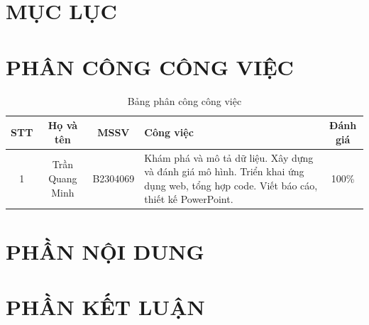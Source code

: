 \documentclass{article} %
\begin{document}
    \pagestyle{empty}
    \renewcommand{\contentsname}{}
    \section*{MỤC LỤC}
    \vspace{-5em}
    \tableofcontents      %
    \newpage

    \pagestyle{fancy}

    \section*{PHÂN CÔNG CÔNG VIỆC}
    \begin{table}[H]
        \centering
        \begin{tabularx}{\textwidth}{|c|c|c|Y|c|}
            \hline
            \textbf{STT} & \textbf{Họ và tên} & \textbf{MSSV} & \textbf{Công việc} & \textbf{Đánh giá} \\ \hline
            
            1 & Trần Quang Minh & B2304069 & Khám phá và mô tả dữ liệu. Xây dựng và đánh giá mô hình. Triển khai ứng dụng web, tổng hợp code. Viết báo cáo, thiết kế PowerPoint. & 100\% \\ \hline
        \end{tabularx}
        \caption{Bảng phân công công việc}
    \end{table}
    \newpage

    \section*{PHẦN NỘI DUNG}
        
    \newpage

    \section*{PHẦN KẾT LUẬN}
        
    \newpage
\end{document}
